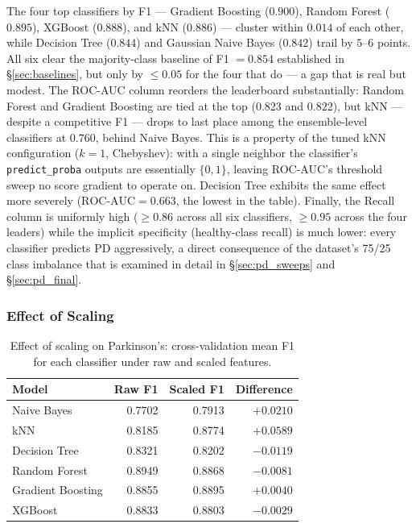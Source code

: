 \documentclass[11pt,a4paper]{article}
\begin{document}
The four top classifiers by F1 --- Gradient Boosting ($0.900$), Random
Forest ($0.895$), XGBoost ($0.888$), and kNN ($0.886$) --- cluster within
$0.014$ of each other, while Decision Tree ($0.844$) and Gaussian Naive
Bayes ($0.842$) trail by $5\text{--}6$ points. All six clear the
majority-class baseline of F1 $= 0.854$ established in
\S\ref{sec:baselines}, but only by $\leq 0.05$ for the four that do --- a
gap that is real but modest. The ROC-AUC column reorders the leaderboard
substantially: Random Forest and Gradient Boosting are tied at the top
($0.823$ and $0.822$), but kNN --- despite a competitive F1 --- drops to
last place among the ensemble-level classifiers at $0.760$, behind Naive
Bayes. This is a property of the tuned kNN configuration ($k = 1$,
Chebyshev): with a single neighbor the classifier's \texttt{predict\_proba}
outputs are essentially $\{0, 1\}$, leaving ROC-AUC's threshold sweep no
score gradient to operate on. Decision Tree exhibits the same effect more
severely ($\text{ROC-AUC} = 0.663$, the lowest in the table). Finally, the
Recall column is uniformly high ($\geq 0.86$ across all six classifiers,
$\geq 0.95$ across the four leaders) while the implicit specificity
(healthy-class recall) is much lower: every classifier predicts PD
aggressively, a direct consequence of the dataset's 75/25 class imbalance
that is examined in detail in \S\ref{sec:pd_sweeps} and \S\ref{sec:pd_final}.

\subsubsection{Effect of Scaling}

\begin{table}[H]
    \centering
    \caption{Effect of scaling on Parkinson's: cross-validation mean F1 for
    each classifier under raw and scaled features.}
    \label{tab:pd_scaling}
    \begin{tabular}{lrrr}
        \toprule
        Model              & Raw F1 & Scaled F1 & Difference \\
        \midrule
        Naive Bayes        & 0.7702 & 0.7913    & $+0.0210$  \\
        kNN                & 0.8185 & 0.8774    & $+0.0589$  \\
        Decision Tree      & 0.8321 & 0.8202    & $-0.0119$  \\
        Random Forest      & 0.8949 & 0.8868    & $-0.0081$  \\
        Gradient Boosting  & 0.8855 & 0.8895    & $+0.0040$  \\
        XGBoost            & 0.8833 & 0.8803    & $-0.0029$  \\
        \bottomrule
    \end{tabular}
\end{table}
\end{document}
